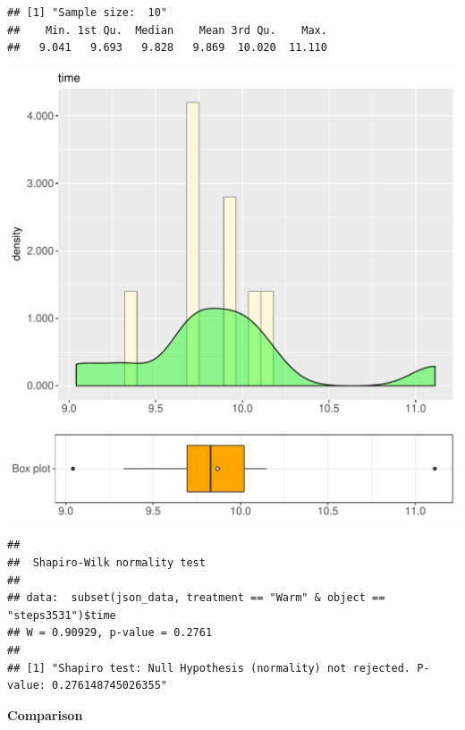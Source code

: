\documentclass{article}\usepackage[]{graphicx}\usepackage[]{color}
\makeatletter
\def\maxwidth{ %
  \ifdim\Gin@nat@width>\linewidth
    \linewidth
  \else
    \Gin@nat@width
  \fi
}
\newenvironment{kframe}{%
 \def\at@end@of@kframe{}%
 \ifinner\ifhmode%
  \def\at@end@of@kframe{\end{minipage}}%
  \begin{minipage}{\columnwidth}%
 \fi\fi%
 \def\FrameCommand##1{\hskip\@totalleftmargin \hskip-\fboxsep
 \colorbox{shadecolor}{##1}\hskip-\fboxsep
     \hskip-\linewidth \hskip-\@totalleftmargin \hskip\columnwidth}%
 \MakeFramed {\advance\hsize-\width
   \@totalleftmargin\z@ \linewidth\hsize
   \@setminipage}}%
 {\par\unskip\endMakeFramed%
 \at@end@of@kframe}
\newenvironment{knitrout}{}{} %
\makeatother
\begin{document}
\begin{knitrout}
\color{fgcolor}\begin{kframe}
\begin{verbatim}
## [1] "Sample size:  10"
##    Min. 1st Qu.  Median    Mean 3rd Qu.    Max. 
##   9.041   9.693   9.828   9.869  10.020  11.110
\end{verbatim}
\end{kframe}
\includegraphics[width=\maxwidth]{figure/RH1_Warm_steps3531-1} 
\begin{kframe}\begin{verbatim}
## 
## 	Shapiro-Wilk normality test
## 
## data:  subset(json_data, treatment == "Warm" & object == "steps3531")$time
## W = 0.90929, p-value = 0.2761
## 
## [1] "Shapiro test: Null Hypothesis (normality) not rejected. P-value: 0.276148745026355"
\end{verbatim}
\end{kframe}
\end{knitrout}
  
 \textbf{Comparison}
  
\end{document}
